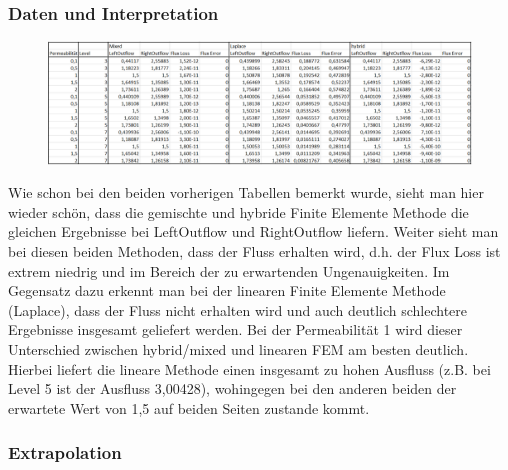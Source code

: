 \subsubsection{Daten und Interpretation}
\begin{figure}[H]
	\centering
		\includegraphics[width=\textwidth]{../../19/blatt5tabelle.png} 
\end{figure}
Wie schon bei den beiden vorherigen Tabellen bemerkt wurde, sieht man hier wieder schön, dass die gemischte und hybride Finite Elemente Methode die gleichen Ergebnisse bei LeftOutflow und RightOutflow liefern. \newline
Weiter sieht man bei diesen beiden Methoden, dass der Fluss erhalten wird, d.h. der Flux Loss ist extrem niedrig und im Bereich der zu erwartenden Ungenauigkeiten. \newline Im Gegensatz dazu erkennt man bei der linearen Finite Elemente Methode (Laplace), dass der Fluss nicht erhalten wird und auch deutlich schlechtere Ergebnisse insgesamt geliefert werden. \newline
Bei der Permeabilität 1 wird dieser Unterschied zwischen hybrid/mixed und linearen FEM am besten deutlich. Hierbei liefert die lineare Methode einen insgesamt zu hohen Ausfluss (z.B. bei Level 5 ist der Ausfluss 3,00428), wohingegen bei den anderen beiden der erwartete Wert von 1,5 auf beiden Seiten zustande kommt. 

\subsubsection{Extrapolation}

